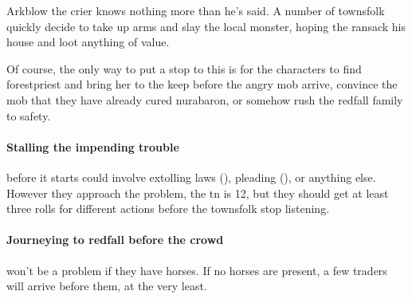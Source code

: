 Arkblow the crier knows nothing more than he's said.  A number of townsfolk quickly decide to take up arms and slay the local monster, hoping the ransack his house and loot anything of value.

Of course, the only way to put a stop to this is for the characters to find \gls{forestpriest} and bring her to the keep before the angry mob arrive, convince the mob that they have already cured \gls{nurabaron}, or somehow rush the \gls{redfall} family to safety.

\paragraph{Stalling the impending trouble}
before it starts could involve extolling laws (), pleading (), or anything else.
However they approach the problem, the \gls{tn} is 12, but they should get at least three rolls for different actions before the townsfolk stop listening.

\paragraph{Journeying to \gls{redfall} before the crowd}
won't be a problem if they have horses.
If no horses are present, a few traders will arrive before them, at the very least.

